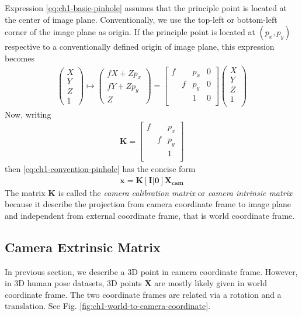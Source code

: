 Expression \ref{eq:ch1-basic-pinhole} assumes that the principle point is located at the center of image plane. Conventionally, we use the top-left or bottom-left corner of the image plane as origin. If the principle point is located at $(p_x, p_y)$ respective to a conventionally defined origin of image plane, this expression becomes
\begin{gather}
\label{eq:ch1-convention-pinhole}
\begin{pmatrix} X  \\ Y \\ Z \\ 1 \end{pmatrix} \mapsto
\begin{pmatrix} fX + Zp_x  \\ fY + Zp_y \\ Z  \end{pmatrix}
=
\begin{bmatrix}
f &   &  p_x & 0\\
& f &  p_y & 0\\
&   & 1 & 0\\ 
\end{bmatrix}
\begin{pmatrix}
X\\
Y\\
Z\\
1\\
\end{pmatrix}
\end{gather}
Now, writing
\begin{gather}
	\mathbf{K}
	=
	\begin{bmatrix}
		f &   &  p_x\\
		& f &  p_y\\
		&   & 1\\ 
	\end{bmatrix}
	\label{eq:ch1-intrinsic-matrix}
\end{gather}
then \ref{eq:ch1-convention-pinhole} has the concise form
\begin{gather}
\mathbf{x = K [I  |  0]X_{cam}} 
\end{gather}
The matrix $\mathbf{K}$ is called the \textit{camera calibration matrix} or \textit{camera intrinsic matrix} because it describe the projection from camera coordinate frame to image plane and independent from external coordinate frame, that is world coordinate frame.

\subsection{Camera Extrinsic Matrix}
In previous section, we describe a 3D point in camera coordinate frame. However, in 3D human pose datasets, 3D points $\mathbf{X}$ are mostly likely given in world coordinate frame. The two coordinate frames are related via a rotation and a translation. See Fig. \ref{fig:ch1-world-to-camera-coordinate}.

